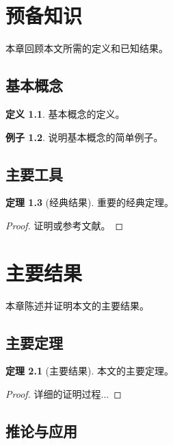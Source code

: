 \documentclass[12pt,a4paper]{report}
\theoremstyle{definition}
\newtheorem{theorem}{定理}[chapter]
\newtheorem{definition}[theorem]{定义}
\newtheorem{example}[theorem]{例子}
\begin{document}
\chapter{预备知识}\label{ch:prelim}

本章回顾本文所需的定义和已知结果。

\section{基本概念}

\begin{definition}\label{def:fundamental}
基本概念的定义。
\end{definition}

\begin{example}
说明基本概念的简单例子。
\end{example}

\section{主要工具}

\begin{theorem}[经典结果]\label{thm:classical}
重要的经典定理。
\end{theorem}

\begin{proof}
证明或参考文献。
\end{proof}

\chapter{主要结果}\label{ch:main}

本章陈述并证明本文的主要结果。

\section{主要定理}

\begin{theorem}[主要结果]\label{thm:main}
本文的主要定理。
\end{theorem}

\begin{proof}
详细的证明过程...
\end{proof}

\section{推论与应用}
\end{document}
